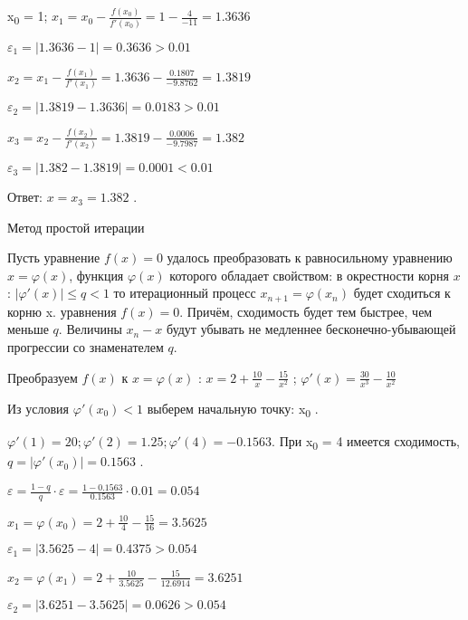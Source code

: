 \documentclass[10pt, a4paper]{scrartcl}
\begin{document}
x\textsubscript{0} = 1;
\(\displaystyle x_1 = x_0 - \frac{f(x_0)}{f'(x_0)} = 1 - \frac{4}{-11} = 1.3636\)

\(\displaystyle \varepsilon_1 = |1.3636 - 1| = 0.3636 > 0.01\)

\(\displaystyle x_2 = x_1 - \frac{f(x_1)}{f'(x_1)} = 1.3636 - \frac{0.1807}{-9.8762} = 1.3819\)

\(\displaystyle \varepsilon_2 = |1.3819 - 1.3636| = 0.0183 > 0.01\)

\(\displaystyle x_3 = x_2 - \frac{f(x_2)}{f'(x_2)} = 1.3819 - \frac{0.0006}{-9.7987} = 1.382\)

\(\displaystyle \varepsilon_3 = |1.382 - 1.3819| = 0.0001 < 0.01\)

Ответ: \(x = x_3 = 1.382\) .

\pagebreak

Метод простой итерации

Пусть уравнение \(f(x)=0\) удалось преобразовать к равносильному
уравнению \(x=\varphi(x)\), функция \(\varphi(x)\) которого обладает
свойством: в окрестности корня \(x\): \(| \varphi '(x) | \leq q < 1\) то
итерационный процесс \(x_{n+1} = \varphi(x_n)\) будет сходиться к корню
x. уравнения \(f(x)=0\). Причём, сходимость будет тем быстрее, чем
меньше \(q\). Величины \(x_n - x\) будут убывать не медленнее
бесконечно-убывающей прогрессии со знаменателем \(q\).

\vspace{5mm}

Преобразуем \(f(x)\) к \(x=\varphi(x)\) :
\(\displaystyle x = 2 + \frac{10}{x} - \frac{15}{x^2}\) ;
\(\displaystyle \varphi '(x) = \frac{30}{x^3} - \frac{10}{x^2}\)

Из условия \(\varphi '(x_0) < 1\) выберем начальную точку:
x\textsubscript{0} .

\(\displaystyle \varphi '(1) = 20; \varphi '(2) = 1.25; \varphi '(4) = -0.1563 .\)
При x\textsubscript{0} = 4 имеется сходимость,
\(q = | \varphi '(x_0) | = 0.1563\) .

\(\displaystyle \varepsilon = \frac{1 - q}{q} \cdot \varepsilon = \frac{1 - 0.1563}{0.1563} \cdot 0.01 = 0.054\)

\(\displaystyle x_1 = \varphi(x_0) = 2 + \frac{10}{4} - \frac{15}{16} = 3.5625\)

\(\displaystyle \varepsilon_1 = |3.5625 - 4| = 0.4375 > 0.054\)

\(\displaystyle x_2 = \varphi(x_1) = 2 + \frac{10}{3.5625} - \frac{15}{12.6914} = 3.6251\)

\(\displaystyle \varepsilon_2 = |3.6251 - 3.5625| = 0.0626 > 0.054\)
\end{document}
